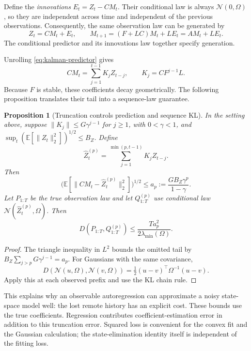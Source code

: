 \documentclass[11pt,twoside]{article}
\newcommand{\E}{\mathbb E}
\newcommand{\KL}{D}
\newtheorem{proposition}[theorem]{Proposition}
\theoremstyle{definition}
\theoremstyle{remark}
\begin{document}
Define the \emph{innovations} \(E_t=Z_t-CM_t\).
Their conditional law is always \(\mathcal N(0,\Omega)\), so they are
independent across time and independent of the previous observations.
Consequently, the same observation law can be generated by
\begin{equation}
 Z_t=CM_t+E_t,\qquad
 M_{t+1}=(F+LC)M_t+LE_t=AM_t+LE_t.
 \label{eq:innovations-generation}
\end{equation}
The conditional predictor and its innovations law together specify
generation.

Unrolling \cref{eq:kalman-predictor} gives
\begin{equation}
 CM_t=\sum_{j=1}^{t-1}K_jZ_{t-j},\qquad K_j=CF^{j-1}L.
 \label{eq:history-coefficients}
\end{equation}
Because \(F\) is stable, these coefficients decay geometrically.
The following proposition translates their tail into a sequence-law
guarantee.

\begin{proposition}[Truncation controls prediction and sequence KL]
\label{prop:truncation}
In the setting above, suppose
\(\lVert K_j\rVert\le G\gamma^{j-1}\) for \(j\ge1\), with
\(0<\gamma<1\), and
\(\sup_t(\E[\lVert Z_t\rVert_2^2])^{1/2}\le B_Z\).
Define
\[
 \widehat Z_t^{(p)}=\sum_{j=1}^{\min(p,t-1)}K_jZ_{t-j}.
\]
Then
\begin{equation}
 \bigl(\E[\lVert CM_t-\widehat Z_t^{(p)}\rVert_2^2]\bigr)^{1/2}
 \le a_p:=\frac{GB_Z\gamma^p}{1-\gamma}.
 \label{eq:truncation-mean}
\end{equation}
Let \(P_{1:T}\) be the true observation law and let \(Q^{(p)}_{1:T}\)
use conditional law \(\mathcal N(\widehat Z_t^{(p)},\Omega)\).
Then
\begin{equation}
 \KL(P_{1:T}, Q^{(p)}_{1:T})
 \le\frac{T a_p^2}{2\lambda_{\min}(\Omega)}.
 \label{eq:truncation-kl}
\end{equation}
\end{proposition}

\begin{proof}
The triangle inequality in \(L^2\) bounds the omitted tail by
\(B_Z\sum_{j>p}G\gamma^{j-1}=a_p\).
For Gaussians with the same covariance,
\[
 \KL(\mathcal N(u,\Omega),\mathcal N(v,\Omega))
 =\tfrac12(u-v)^\top\Omega^{-1}(u-v).
\]
Apply this at each observed prefix and use the KL chain rule.
\end{proof}

This explains why an observable autoregression can approximate a noisy
state-space model well: the lost remote history has an explicit cost.
These bounds use the true coefficients.
Regression contributes coefficient-estimation error in addition to
this truncation error.
Squared loss is convenient for the convex fit and the Gaussian
calculation; the state-elimination identity itself is independent of
the fitting loss.
\end{document}
